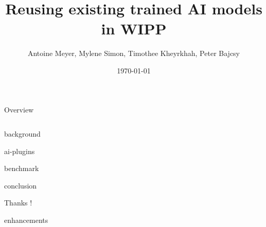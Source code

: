 \documentclass[aspectratio=169,table]{beamer}
\title{Reusing existing trained AI models in WIPP}
\author[Author]{Antoine Meyer, Mylene Simon, Timothee Kheyrkhah, Peter Bajcsy}
\date[\today]{\today}
\begin{document}
  \begin{frame}[plain]
    \titlepage
  \end{frame}

  \begin{frame}{Overview}
    \begin{columns}[onlytextwidth,T]
      \begin{column}{.45\textwidth}
        \tableofcontents[sections=1-2]
      \end{column}
      \begin{column}{.45\textwidth}
        \tableofcontents[sections=3-4]
      \end{column}
    \end{columns}
  \end{frame}

  {background}

  \begin{frame}[plain]
    \centering
    \tableofcontents[sections=2]
  \end{frame}
  {ai-plugins}

  \begin{frame}[plain]
    \centering
    \tableofcontents[sections=3]
  \end{frame}
  {benchmark}

  \begin{frame}[plain]
    \centering
    \tableofcontents[sections=4]
  \end{frame}
  {conclusion}

  \begin{frame}[plain]
    \centering
    \LARGE Thanks !
  \end{frame}

  {enhancements}

\end{document}

